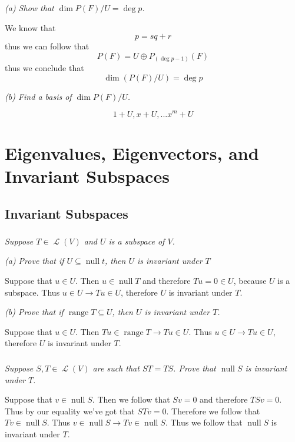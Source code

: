 \documentclass[11pt,oneside,titlepage]{book}
\DeclareMathOperator \map {\mathcal {L}}
\DeclareMathOperator \ns {null}
\DeclareMathOperator \range {range}
\begin{document}
\textit{(a) Show that $\dim P(F)/U = \deg p$.}

We know that
$$p = sq + r$$
thus we can follow that
$$P(F) = U \oplus P_{(\deg p - 1)}(F)$$
thus we conclude that
$$\dim (P(F)/U) = \deg p$$

\textit{(b) Find a basis of $\dim P(F)/U$.}

$$1 + U, x + U, ... x^m + U$$

\chapter{Eigenvalues, Eigenvectors, and Invariant Subspaces}

\section{Invariant Subspaces}

\subsection{}

\textit{Suppose $T \in \map(V)$ and $U$ is a subspace of $V$.}

\textit{(a) Prove that if $U \subseteq \ns t$, then $U$ is invariant under $T$}

Suppose that $u \in U$. Then $u \in \ns T$ and therefore $Tu = 0 \in U$, because $U$ is
a subspace. Thus $u \in U \to Tu \in U$, therefore $U$ is invariant under $T$.

\textit{(b) Prove that if $\range T \subseteq U$, then $U$ is invariant under $T$. }

Suppose that $u \in U$. Then $Tu \in \range T \to Tu \in U$.
Thus $u \in U \to Tu \in U$, therefore $U$ is invariant under $T$.

\subsection{}

\textit{Suppose $S, T \in \map(V)$ are such that $ST = TS$. Prove that $\ns S$ is invariant under
  $T$.}

Suppose that $v \in \ns S$. Then we follow that $Sv = 0$ and therefore $TSv = 0$. Thus
by our equality we've got that $STv = 0$. Therefore we follow that $Tv \in \ns S$. Thus
$v \in \ns S \to Tv \in \ns S$. Thus we follow that $\ns S$ is invariant under $T$.

\subsection{}
\end{document}
